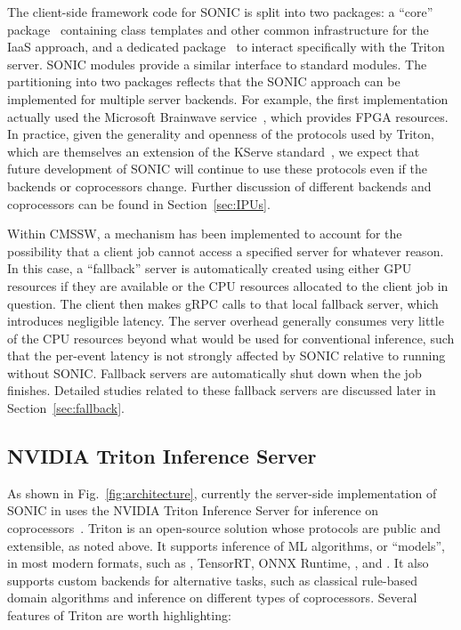 The client-side framework code for SONIC is split into two packages: a ``core'' package~\cite{SONIC_cms} containing class templates and other common infrastructure for the IaaS approach, and a dedicated package~\cite{SONIC_cms_triton} to interact specifically with the Triton server. SONIC modules provide a similar interface to standard \CMSSW modules. The partitioning into two packages reflects that the SONIC approach can be implemented for multiple server backends. For example, the first implementation~\cite{SONIC_origin,Duarte:2019fta} actually used the Microsoft Brainwave service~\cite{Brainwave}, which provides FPGA resources. In practice, given the generality and openness of the protocols used by Triton, which are themselves an extension of the KServe standard~\cite{KServe}, we expect that future development of SONIC will continue to use these protocols even if the backends or coprocessors change. Further discussion of different backends and coprocessors can be found in Section~\ref{sec:IPUs}.

Within CMSSW, a mechanism has been implemented to account for the possibility that a client job cannot access a specified server for whatever reason. In this case, a ``fallback'' server is automatically created using either GPU resources if they are available or the CPU resources allocated to the client job in question. The client then makes gRPC calls to that local fallback server, which introduces negligible latency. The server overhead generally consumes very little of the CPU resources beyond what would be used for conventional inference, such that the per-event latency is not strongly affected by SONIC relative to running without SONIC. Fallback servers are automatically shut down when the job finishes. Detailed studies related to these fallback servers are discussed later in Section~\ref{sec:fallback}.

\subsection{NVIDIA Triton Inference Server}
\label{sec:triton}
As shown in Fig.~\ref{fig:architecture}, currently the server-side implementation of SONIC in \CMSSW uses the NVIDIA Triton Inference Server for inference on coprocessors~\cite{triton, triton_readme}. Triton is an open-source solution whose protocols are public and extensible, as noted above. It supports inference of ML algorithms, or ``models'', in most modern formats, such as \PYTORCH, TensorRT, ONNX Runtime, \TENSORFLOW, and \XGBOOST. It also supports custom backends for alternative tasks, such as classical rule-based domain algorithms and inference on different types of coprocessors. Several features of Triton are worth highlighting:

